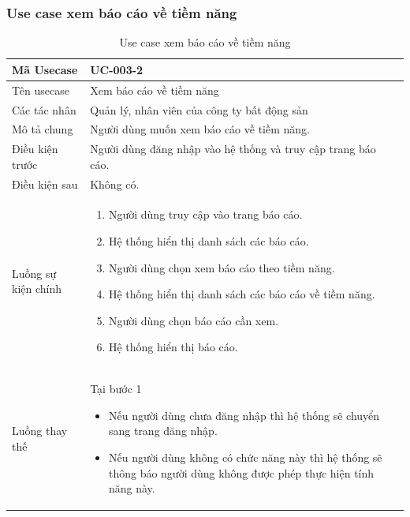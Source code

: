 \documentclass[12pt,a4paper]{article}
\begin{document}
    \subsubsection*{Use case xem báo cáo về tiềm năng}
    \begin{table}[H]
        \centering
        \begin{tabular}{|p{3.5cm}|p{11.5cm}|c|}
            \hline
            Mã Usecase      & UC-003-2                                                     \\
            \hline
            Tên usecase     & Xem báo cáo về tiềm năng                                     \\
            \hline
            Các tác nhân    & Quản lý, nhân viên của công ty bất động sản                  \\
            \hline
            Mô tả chung     & Người dùng muốn xem báo cáo về tiềm năng.                    \\
            \hline
            Điều kiện trước & Người dùng đăng nhập vào hệ thống và truy cập trang báo cáo. \\
            \hline
            Điều kiện sau   & Không có.                                                    \\
            \hline
            Luồng sự kiện chính & \vspace{-.8cm}\begin{enumerate}
                                                    \item Người dùng truy cập vào trang báo cáo.
                                                    \item Hệ thống hiển thị danh sách các báo cáo.
                                                    \item Người dùng chọn xem báo cáo theo tiềm năng.
                                                    \item Hệ thống hiển thị danh sách các báo cáo về tiềm năng.
                                                    \item Người dùng chọn báo cáo cần xem.
                                                    \item Hệ thống hiển thị báo cáo.
            \end{enumerate}
            \\
            \hline
            Luồng thay thế & Tại bước 1\newline
            \vspace{-.8cm}\begin{itemize}
                              \item Nếu người dùng chưa đăng nhập thì hệ thống sẽ chuyển sang trang đăng nhập.
                              \item Nếu người dùng không có chức năng này thì hệ thống sẽ thông báo người dùng không được phép thực hiện tính năng này.
            \end{itemize}
            \\ \hline
        \end{tabular}
        \caption{Use case xem báo cáo về tiềm năng}
    \end{table}
\end{document}
